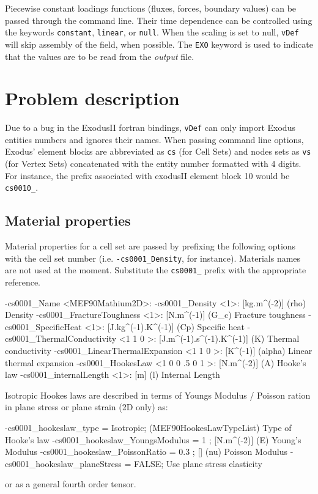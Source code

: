 \documentclass[10pt,oneside]{memoir}
\def\vDef{{\texttt{vDef}} }
\begin{document}
Piecewise constant loadings functions (fluxes, forces, boundary values) can be passed through the command line. Their time dependence can be controlled using the keywords \verb+constant+, \verb+linear+, or \verb+null+. When the scaling is set to null, \vDef will skip assembly of the field, when possible. The \verb+EXO+ keyword is used to indicate that the values are to be read from the \emph{output} file.

\section{Problem description}
Due to a bug in the ExodusII fortran bindings, \vDef can only import Exodus entities numbers and ignores their names. When passing command line options, Exodus' element blocks are abbreviated as \verb+cs+ (for Cell Sets) and nodes sets as \verb+vs+ (for Vertex Sets) concatenated with the entity number formatted with 4 digits. For instance, the prefix associated with exodusII element block 10 would be \verb+cs0010_+.

\subsection{Material properties}
\label{sec:MatProp}
Material properties for a cell set are passed by prefixing the following options with the cell set number (i.e. \verb+-cs0001_Density+, for instance). Materials names are not used at the moment. Substitute the \verb+cs0001_+ prefix with the appropriate reference.
\small{
\begin{boxedverbatim}
-cs0001_Name <MEF90Mathium2D>:  
-cs0001_Density <1>: [kg.m^(-2)] (rho) Density 
-cs0001_FractureToughness <1>: [N.m^(-1)] (G_c) Fracture toughness 
-cs0001_SpecificHeat <1>: [J.kg^(-1).K^(-1)] (Cp) Specific heat 
-cs0001_ThermalConductivity <1 1 0 >: [J.m^(-1).s^(-1).K^(-1)] (K) Thermal conductivity 
-cs0001_LinearThermalExpansion <1 1 0 >: [K^(-1)] (alpha) Linear thermal expansion  
-cs0001_HookesLaw <1 0 0 .5 0 1 >: [N.m^(-2)] (A) Hooke's law 
-cs0001_internalLength <1>: [m] (l) Internal Length 
\end{boxedverbatim}
}

Isotropic Hookes laws are described in terms of  Youngs Modulus / Poisson ration in plane stress or plane strain (2D only) as:
\begin{boxedverbatim}
-cs0001_hookeslaw_type = Isotropic; (MEF90HookesLawTypeList) Type of Hooke's law
-cs0001_hookeslaw_YoungsModulus = 1 ; [N.m^(-2)] (E) Young's Modulus
-cs0001_hookeslaw_PoissonRatio = 0.3 ; [] (nu) Poisson Modulus
-cs0001_hookeslaw_planeStress =  FALSE; Use plane stress elasticity
\end{boxedverbatim}
or as a general fourth order tensor.
\end{document}
